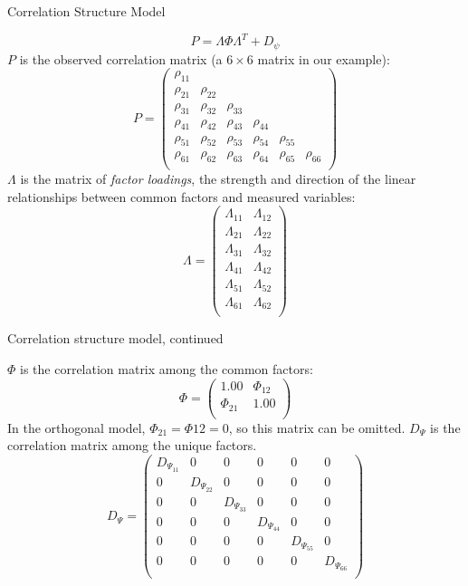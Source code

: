 \documentclass[10pt,ignorenonframetext,]{beamer}
\begin{document}
\begin{frame}{Correlation Structure Model}

\[
P = \Lambda \Phi \Lambda^T + D_\psi
\] \(P\) is the observed correlation matrix (a \(6 \times 6\) matrix in
our example): \[
P = \begin{pmatrix}
\rho_{11} \\
\rho_{21} & \rho_{22} \\
\rho_{31} & \rho_{32} & \rho_{33} \\
\rho_{41} & \rho_{42} & \rho_{43} & \rho_{44} \\
\rho_{51} & \rho_{52} & \rho_{53} & \rho_{54} & \rho_{55} \\
\rho_{61} & \rho_{62} & \rho_{63} & \rho_{64} & \rho_{65} & \rho_{66} \\
\end{pmatrix}
\] \(\Lambda\) is the matrix of \emph{factor loadings}, the strength and
direction of the linear relationships between common factors and
measured variables: \[
\Lambda = \begin{pmatrix}
\Lambda_{11} & \Lambda_{12} \\
\Lambda_{21} & \Lambda_{22} \\
\Lambda_{31} & \Lambda_{32} \\
\Lambda_{41} & \Lambda_{42} \\
\Lambda_{51} & \Lambda_{52} \\
\Lambda_{61} & \Lambda_{62} \\
\end{pmatrix}
\]

\end{frame}

\begin{frame}{Correlation structure model, continued}

\(\Phi\) is the correlation matrix among the common factors: \[
\Phi = \begin{pmatrix}
1.00 & \Phi_{12}\\
\Phi_{21} & 1.00 \\
\end{pmatrix}
\] In the orthogonal model, \(\Phi_{21} = \Phi{12} = 0\), so this matrix
can be omitted. \(D_\Psi\) is the correlation matrix among the unique
factors. \[
D_\Psi = \begin{pmatrix}
D_{\Psi_{11}} & 0 & 0 & 0 & 0 & 0 \\
0 & D_{\Psi_{22}} & 0 & 0 & 0 & 0\\
0 & 0 & D_{\Psi_{33}} & 0 & 0 & 0 \\
0 & 0 & 0 & D_{\Psi_{44}} & 0 & 0 \\
0 & 0 & 0 & 0 & D_{\Psi_{55}} & 0 \\
0 & 0 & 0 & 0 & 0 & D_{\Psi_{66}} \\
\end{pmatrix}
\]

\end{frame}
\end{document}

